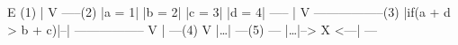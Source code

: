 \begin{minipage}[t]{2in}
\begin{AVerb}
         E (1)
         |
         V
       -----(2)
      |a = 1|
      |b = 2|
      |c = 3|
      |d = 4|
       -----
         |
         V
 -----------------(3)
|if(a + d > b + c)|--|
 -----------------   V
         |          ---(4)
         V         |\dots|
     ---(5)         ---
    |\dots|--> X <---|
     ---
\end{AVerb}
\end{minipage}





